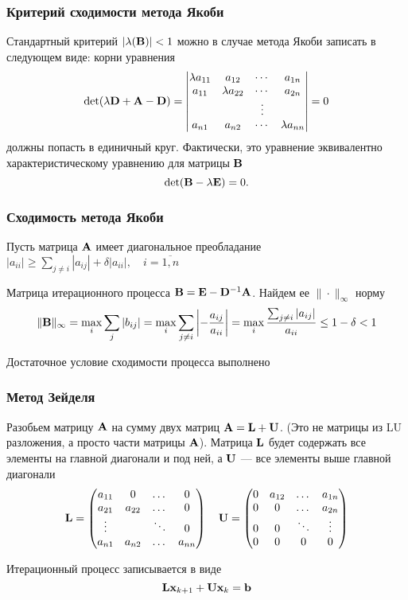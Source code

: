 \documentclass[apectratio=43,unicode]{beamer}
\begin{document}
\begin{frame}\frametitle{Критерий сходимости метода Якоби}
	Стандартный критерий $|\lambda(\mathbf{B})| < 1$ можно в случае метода Якоби
записать в следующем виде: корни уравнения
	\[
		\operatorname{det} (\lambda \mathbf{D} + \mathbf{A} - \mathbf{D}) =
		\begin{vmatrix}
			\lambda a_{11} & a_{12} & \cdots & a_{1n}\\
			a_{11} & \lambda a_{22} & \cdots & a_{2n}\\
			&&\vdots\\
			a_{n1} & a_{n2} & \cdots & \lambda a_{nn}\\
		\end{vmatrix} = 0
	\]
	должны попасть в единичный круг. Фактически, это уравнение эквивалентно
характеристическому уравнению для матрицы $\mathbf{B}$
	\[
		\operatorname{det}(\mathbf{B} - \lambda \mathbf{E}) = 0.
	\]
\end{frame}

\begin{frame}\frametitle{Сходимость метода Якоби}
	Пусть матрица $\mathbf{A}$ имеет диагональное преобладание
	$|a_{ii}| \geq \sum_{j \neq i} |a_{ij}| + \delta |a_{ii}|, \quad i=\overline{1,n}$

	Матрица итерационного процесса $\mathbf{B} = \mathbf{E} - \mathbf{D}^{-1}\mathbf{A}$. Найдем ее $\|\cdot\|_\infty$ норму
	\[
	\|\mathbf{B}\|_\infty = \max_i\sum_j|b_{ij}| = \max_i \sum_{j\neq i} \left|-\frac{a_{ij}}{a_{ii}}\right| =
	\max_i \frac{\sum_{j\neq i} |a_{ij}|}{a_{ii}} \leq 1-\delta < 1
	\]

	Достаточное условие сходимости процесса выполнено
\end{frame}

\begin{frame}\frametitle{Метод Зейделя}
	Разобьем матрицу $\mathbf{A}$ на сумму двух матриц $\mathbf{A} = \mathbf{L} + \mathbf{U}$. (Это не матрицы
из LU разложения, а просто части матрицы $\mathbf{A}$).
	Матрица $\mathbf{L}$ будет содержать все элементы на главной диагонали и под ней, а $\mathbf{U}$ --- все элементы
	выше главной диагонали
	\[
	\mathbf{L} = \begin{pmatrix}
		a_{11}&0&\dots&0\\
		a_{21}&a_{22}&\dots&0\\
		\vdots&&\ddots&0\\
		a_{n1}&a_{n2}&\dots&a_{nn}
	\end{pmatrix}
	\quad
	\mathbf{U} = \begin{pmatrix}
		0&a_{12}&\dots&a_{1n}\\
		0&0&\dots&a_{2n}\\
		0&0&\ddots&\vdots\\
		0&0&0&0\\
	\end{pmatrix}
	\]

	Итерационный процесс записывается в виде
	\[
	\mathbf{L} \mathbf{x}_{k+1} + \mathbf{U} \mathbf{x}_k = \mathbf{b}
	\]
\end{frame}
\end{document}
